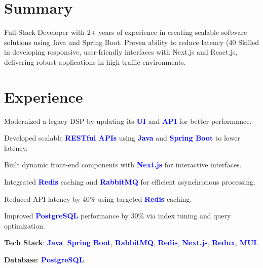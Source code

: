 \documentclass[]{azhagu-swe-resume-openfont}
\begin{document}
\begin{minipage}[t]{0.33\textwidth}
\sectionsep


\end{minipage} 
\hfill
\begin{minipage}[t]{0.66\textwidth} 

\section{Summary}
Full-Stack Developer with 2+ years of experience in creating scalable software solutions using Java and Spring Boot.  
Proven ability to reduce latency (40%
Skilled in developing responsive, user-friendly interfaces with Next.js and React.js, delivering robust applications in high-traffic environments.
\sectionsep




\section{Experience}

\vspace{\topsep}
\begin{tightemize}
    \item Modernized a legacy DSP by updating its \textbf{\textcolor{blue}{UI}} and \textbf{\textcolor{blue}{API}} for better performance.
    \item Developed scalable \textbf{\textcolor{blue}{RESTful APIs}} using \textbf{\textcolor{blue}{Java}} and \textbf{\textcolor{blue}{Spring Boot}} to lower latency.
    \item Built dynamic front-end components with \textbf{\textcolor{blue}{Next.js}} for interactive interfaces.
    \item Integrated \textbf{\textcolor{blue}{Redis}} caching and \textbf{\textcolor{blue}{RabbitMQ}} for efficient asynchronous processing.
    \item Reduced API latency by 40\% using targeted \textbf{\textcolor{blue}{Redis}} caching.
    \item Improved \textbf{\textcolor{blue}{PostgreSQL}} performance by 30\% via index tuning and query optimization.
    \item \textbf{Tech Stack}: \textbf{\textcolor{blue}{Java}}, \textbf{\textcolor{blue}{Spring Boot}}, \textbf{\textcolor{blue}{RabbitMQ}}, \textbf{\textcolor{blue}{Redis}}, \textbf{\textcolor{blue}{Next.js}}, \textbf{\textcolor{blue}{Redux}}, \textbf{\textcolor{blue}{MUI}}.
    \item \textbf{Database}: \textbf{\textcolor{blue}{PostgreSQL}}.
\end{tightemize}
\sectionsep


\end{minipage}
\end{document}
